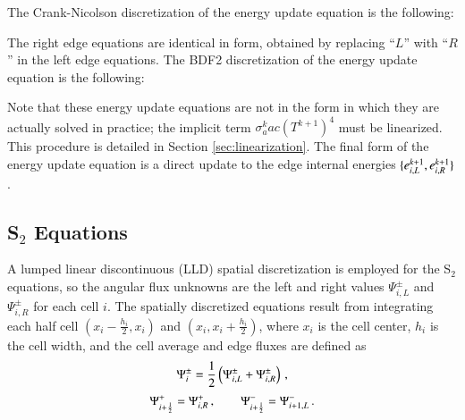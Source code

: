 The Crank-Nicolson discretization of the energy update equation is the following:


The right edge equations are identical in form, obtained by replacing ``$L$'' with
``$R$'' in the left edge equations.
The BDF2 discretization of the energy update equation is the following:


Note that these energy update equations are not in the form in which they
are actually solved in practice; the implicit term $\sigma_a^k a c (T^{k+1})^4$
must be linearized. This procedure is detailed in Section \ref{sec:linearization}.
The final form of the energy update equation is a direct update to the
edge internal energies $\{e_{i,L}^{k+1},e_{i,R}^{k+1}\}$.

\subsection{\texorpdfstring{S$_2$}{S-2} Equations}

A lumped linear discontinuous (LLD) spatial discretization is employed
for the S$_2$ equations, so the angular flux
unknowns are the left and right values $\Psi_{i,L}^\pm$ and
$\Psi_{i,R}^\pm$ for each cell $i$. The spatially
discretized equations result from integrating each half cell
$(x_i-\frac{h_i}{2},x_i)$ and $(x_i,x_i+\frac{h_i}{2})$,
where $x_i$ is the cell center, $h_i$ is the cell width,
and the cell average and edge fluxes are defined as
\begin{equation}
  \Psi_i^\pm=\frac{1}{2}\left( \Psi_{i,L}^\pm + \Psi_{i,R}^\pm \right) \, ,
\end{equation}
\begin{equation}
  \Psi_{i+\frac{1}{2}}^+=\Psi_{i,R}^+ \, ,\qquad \Psi_{i+\frac{1}{2}}^-=\Psi_{i+1,L}^- \, .
\end{equation}

\iftoggle{DEVELOPERMODE}{

}{} %

